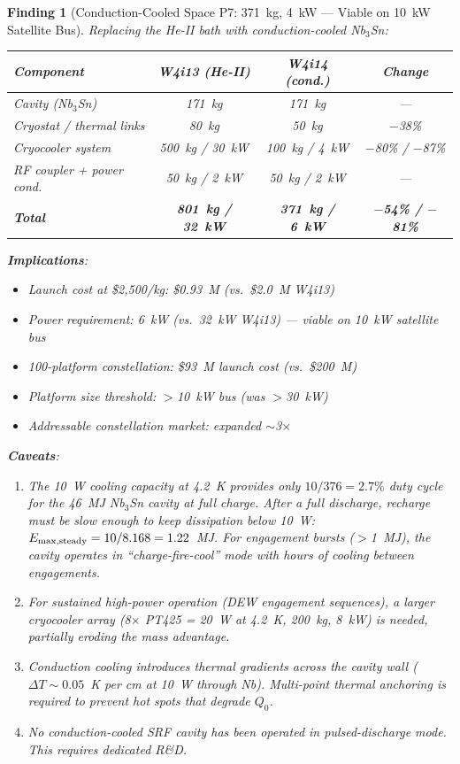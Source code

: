 \documentclass[11pt]{article}
\newtheorem{finding}{Finding}
\begin{document}
\begin{finding}[Conduction-Cooled Space P7: 371~kg, 4~kW --- Viable
on 10~kW Satellite Bus]
\label{find:space-conduction}
Replacing the He-II bath with conduction-cooled Nb$_3$Sn:

\begin{center}
\begin{tabular}{lccc}
\toprule
Component & W4i13 (He-II) & W4i14 (cond.) & Change \\
\midrule
Cavity (Nb$_3$Sn) & 171~kg & 171~kg & --- \\
Cryostat / thermal links & 80~kg & 50~kg & $-$38\% \\
Cryocooler system & 500~kg / 30~kW & 100~kg / 4~kW & $-$80\% / $-$87\% \\
RF coupler + power cond. & 50~kg / 2~kW & 50~kg / 2~kW & --- \\
\midrule
\textbf{Total} & \textbf{801~kg / 32~kW} & \textbf{371~kg / 6~kW}
  & \textbf{$-$54\% / $-$81\%} \\
\bottomrule
\end{tabular}
\end{center}

\textbf{Implications}:
\begin{itemize}[nosep]
  \item Launch cost at \$2,500/kg: \$0.93~M (vs.\ \$2.0~M W4i13)
  \item Power requirement: 6~kW (vs.\ 32~kW W4i13) --- viable on
    10~kW satellite bus
  \item 100-platform constellation: \$93~M launch cost (vs.\ \$200~M)
  \item Platform size threshold: $>$10~kW bus (was $>$30~kW)
  \item Addressable constellation market: expanded $\sim$3$\times$
\end{itemize}

\textbf{Caveats}:
\begin{enumerate}[nosep]
  \item The 10~W cooling capacity at 4.2~K provides only
    $10/376 = 2.7\%$ duty cycle for the 46~MJ Nb$_3$Sn cavity at
    full charge. After a full discharge, recharge must be slow
    enough to keep dissipation below 10~W: $E_{\rm max,steady}
    = 10/8.168 = 1.22$~MJ. For engagement bursts ($>$1~MJ), the
    cavity operates in ``charge-fire-cool'' mode with hours of
    cooling between engagements.
  \item For sustained high-power operation (DEW engagement sequences),
    a larger cryocooler array (8$\times$ PT425 = 20~W at 4.2~K,
    200~kg, 8~kW) is needed, partially eroding the mass advantage.
  \item Conduction cooling introduces thermal gradients across the
    cavity wall ($\Delta T \sim 0.05$~K per cm at 10~W through Nb).
    Multi-point thermal anchoring is required to prevent hot spots
    that degrade $Q_0$.
  \item No conduction-cooled SRF cavity has been operated in
    pulsed-discharge mode. This requires dedicated R\&D.
\end{enumerate}


\end{finding}
\end{document}
